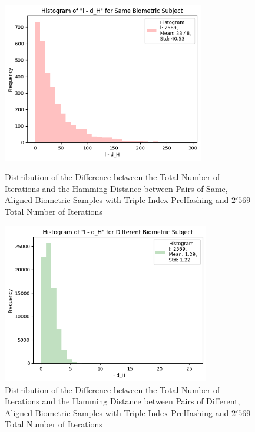\begin{enumerate}
\begin{itemize}
            \begin{figure}[H]
                \centering
                \begin{minipage}[b]{0.48\linewidth}
                    \centering
                    \includegraphics[width=\linewidth,height=7cm,keepaspectratio]{latex-img/l-dHconfig3_same.png}
                    \caption{Distribution of the Difference between the Total Number of Iterations and the Hamming Distance between Pairs of Same, Aligned Biometric Samples with Triple Index PreHashing and $2'569$ Total Number of Iterations}
                    \label{l-dHconfig3_same}
                \end{minipage}
                \hfill
                \begin{minipage}[b]{0.48\linewidth}
                    \centering
                    \includegraphics[width=\linewidth,height=7cm,keepaspectratio]{latex-img/l-dHconfig3_diff.png}
                    \caption{Distribution of the Difference between the Total Number of Iterations and the Hamming Distance between Pairs of Different, Aligned Biometric Samples with Triple Index PreHashing and $2'569$ Total Number of Iterations}
                    \label{l-dHconfig3_diff}
                \end{minipage}
            \end{figure}


\end{itemize}
\end{enumerate}
